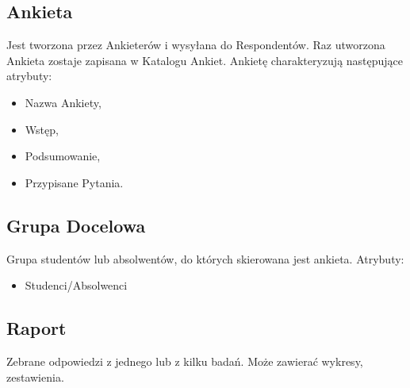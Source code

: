 \subsection{Ankieta}

Jest tworzona przez Ankieterów i wysyłana do Respondentów. Raz utworzona Ankieta zostaje zapisana w Katalogu Ankiet. Ankietę charakteryzują następujące atrybuty:

\begin{itemize}
\item Nazwa Ankiety,
\item Wstęp,
\item Podsumowanie,
\item Przypisane Pytania.
\end{itemize}

\subsection{Grupa Docelowa}

Grupa studentów lub absolwentów, do których skierowana jest ankieta. Atrybuty:

\begin{itemize}
\item Studenci\slash Absolwenci
\end{itemize}

\subsection{Raport}

Zebrane odpowiedzi z jednego lub z kilku badań. Może zawierać wykresy, zestawienia.


%

%

